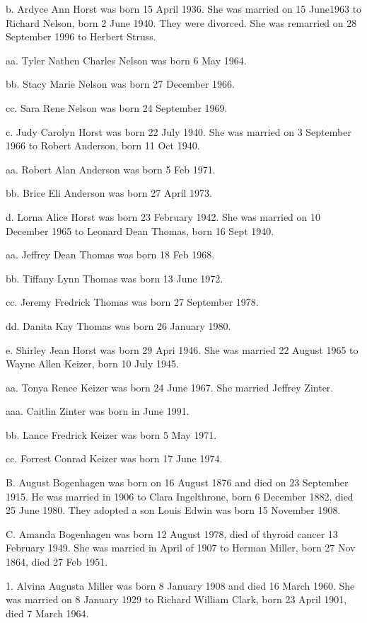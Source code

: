 \documentclass[a4paper]{article}
\begin{document}
b. Ardyce Ann Horst was born 15 April 1936.  She was married on 15 June1963 to Richard Nelson, born 2 June 1940.  They were divorced.  She was remarried on 28 September 1996 to Herbert Struss.

aa. Tyler Nathen Charles Nelson  was born 6 May 1964.

bb. Stacy Marie Nelson was born 27 December 1966.

cc. Sara Rene Nelson was born 24 September 1969.

c. Judy Carolyn Horst was born 22 July 1940.  She was married on 3 September 1966 to Robert Anderson, born 11 Oct 1940.

aa. Robert Alan Anderson was born 5 Feb 1971.

bb. Brice Eli Anderson was born 27 April 1973.

d. Lorna Alice Horst was born 23 February 1942.  She was married on 10 December 1965 to Leonard Dean Thomas, born 16 Sept 1940.

aa. Jeffrey Dean Thomas was born 18 Feb 1968.

bb. Tiffany Lynn Thomas was born 13 June 1972.

cc. Jeremy Fredrick Thomas was born 27 September 1978.

dd. Danita Kay Thomas was born 26 January 1980.

e. Shirley Jean Horst was born 29 Apri 1946.  She was married 22 August 1965 to Wayne Allen Keizer, born 10 July 1945.

aa. Tonya Renee Keizer was born 24 June 1967. She married Jeffrey Zinter.
				 
aaa. Caitlin Zinter was born in June 1991. 

bb. Lance Fredrick Keizer was born 5 May 1971.

cc. Forrest Conrad Keizer was born 17 June 1974.

B. August Bogenhagen was born on 16 August 1876 and died on 23 September 1915. He was married in 1906 to Clara Ingelthrone, born 6 December 1882, died 25 June 1980.  They adopted a son Louis Edwin was born 15 November 1908.

C. Amanda Bogenhagen was born 12 August 1978, died of thyroid cancer 13 February 1949.  She was married in April of 1907 to Herman Miller, born 27 Nov 1864, died 27 Feb 1951.

1. Alvina Augusta Miller was born 8 January 1908 and died 16 March 1960.  She was married on 8 January 1929 to Richard William Clark, born 23 April 1901, died 7 March 1964.
\end{document}
